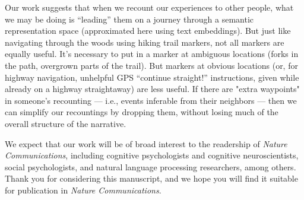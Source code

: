 \documentclass[11pt,stdletter,orderfromtodate,sigleft]{newlfm}
\newcommand{\journal}{Nature Communications}
\begin{document}
\begin{newlfm}
  Our work suggests that when we recount our experiences to other people, what
  we may be doing is ``leading'' them on a journey through a semantic
  representation space (approximated here using text embeddings). But just like
  navigating through the woods using hiking trail markers, not all markers are
  equally useful. It's necessary to put in a marker at ambiguous locations
  (forks in the path, overgrown parts of the trail). But markers at obvious
  locations (or, for highway navigation, unhelpful GPS ``continue straight!''
  instructions, given while already on a highway straightaway) are less useful.
  If there are "extra waypoints" in someone's recounting --- i.e., events
  inferable from their neighbors --- then we can simplify our recountings by
  dropping them, without losing much of the overall structure of the narrative.
  
We expect that our work will be of broad interest to the readership of \textit{\journal}, including
cognitive psychologists and cognitive neuroscientists, social psychologists, and natural language
processing researchers, among others. Thank you for considering this manuscript, and we
hope you will find it suitable for publication in \textit{\journal}.


\end{newlfm}
\end{document}
